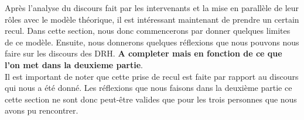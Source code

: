 Après l'analyse du discours fait par les intervenants et la mise en parallèle de leur rôles avec le modèle théorique, il est intéressant maintenant de prendre un certain recul. Dans cette section, nous donc commencerons par donner quelques limites de ce modèle. Ensuite, nous donnerons quelques  réflexions que nous pouvons nous faire sur les discours des DRH. \textbf{A completer mais en fonction de ce que l'on met dans la deuxieme partie}.\\

Il est important de noter que cette prise de recul est faite par rapport au discours qui nous a été donné. Les réflexions que nous faisons dans la deuxième partie ce cette section ne sont donc peut-être valides que pour les trois personnes que nous avons pu rencontrer. \\